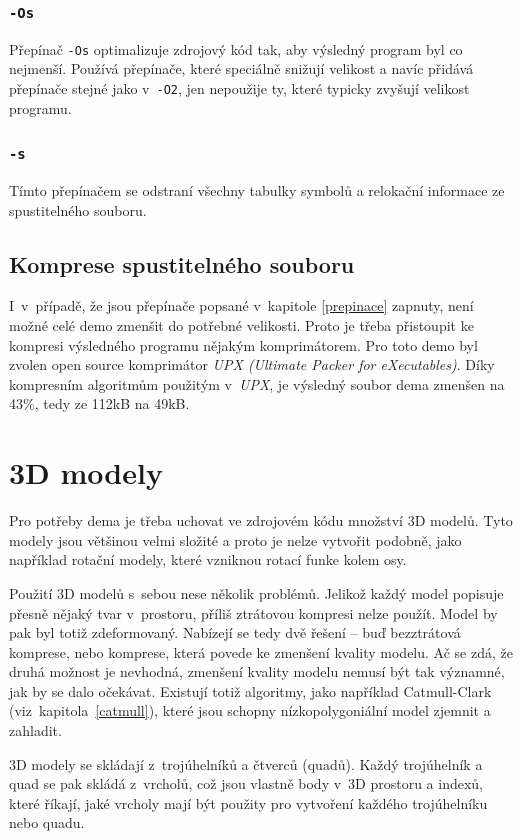 \subsection{\texttt{-Os}}
Přepínač \texttt{-Os} optimalizuje zdrojový kód tak, aby výsledný program byl co nejmenší. 
Používá přepínače, které speciálně snižují velikost a navíc přidává přepínače stejné jako v~\texttt{-O2}, jen nepoužije ty, které typicky zvyšují velikost programu.
\subsection{\texttt{-s}}
Tímto přepínačem se odstraní všechny tabulky symbolů a relokační informace ze spustitelného souboru.

\section{Komprese spustitelného souboru}
I~v~případě, že jsou přepínače popsané v~kapitole \ref{prepinace} zapnuty, není možné celé demo zmenšit do potřebné velikosti.
Proto je třeba přistoupit ke kompresi výsledného programu nějakým komprimátorem.
Pro toto demo byl zvolen open source komprimátor \emph{UPX (Ultimate Packer for eXecutables)}.
Díky kompresním algoritmům použitým v~\emph{UPX}, je výsledný soubor dema zmenšen na 43\%, tedy ze 112kB na 49kB.


\chapter{3D modely}\label{3dmodely}
Pro potřeby dema je třeba uchovat ve zdrojovém kódu množství 3D modelů. 
Tyto modely jsou většinou velmi složité a proto je nelze vytvořit podobně, jako například rotační modely, které vzniknou rotací funke kolem osy.

Použití 3D modelů s~sebou nese několik problémů.
Jelikož každý model popisuje přesně nějaký tvar v~prostoru, příliš ztrátovou kompresi nelze použít.
Model by pak byl totiž zdeformovaný.
Nabízejí se tedy dvě řešení -- buď bezztrátová komprese, nebo komprese, která povede ke zmenšení kvality modelu.
Ač se zdá, že druhá možnost je nevhodná, zmenšení kvality modelu nemusí být tak významné, jak by se dalo očekávat.
Existují totiž algoritmy, jako například Catmull-Clark (viz~kapitola~\ref{catmull}), které jsou schopny nízkopolygoniální model zjemnit a zahladit.

3D modely se skládají z~trojúhelníků a čtverců (quadů).
Každý trojúhelník a quad se pak skládá z~vrcholů, což jsou vlastně body v~3D prostoru a indexů, které říkají, jaké vrcholy mají být použity pro vytvoření každého trojúhelníku nebo quadu.

